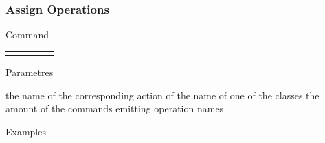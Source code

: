\documentclass[10pt]{beamer}
\begin{document}
\begin{frame}[t] \frametitle{Assign Operations}

	\begin{block}{Command} 
		\begin{tabularx}{\textwidth}{@{}l@{}l@{}l@{}l@{}R}
			 &
				 &
				 &
				 & \InstrItem
		\end{tabularx}
	\end{block}

	\begin{block}{Parametres} \begin{itemize}
		    the name of the corresponding action of 
		     the name of one of the classes
		    the amount of the commands emitting operation names
	\end{itemize} \end{block}

	\begin{block}{Examples}
	\end{block}

\end{frame}
\end{document}
